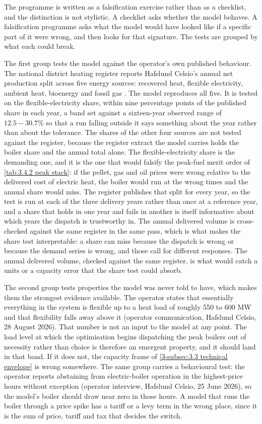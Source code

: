 The programme is written as a falsification exercise rather than as a checklist, and the distinction is not stylistic. A checklist asks whether the model behaves. A falsification programme asks what the model would have looked like if a specific part of it were wrong, and then looks for that signature. The tests are grouped by what each could break.

The first group tests the model against the operator's own published behaviour. The national district heating register reports Hafslund Celsio's annual net production split across five energy sources: recovered heat, flexible electricity, ambient heat, bioenergy and fossil gas \cite{norsk_fjernvarme_fjernkontrollenno_nodate}. The model reproduces all five. It is tested on the flexible-electricity share, within nine percentage points of the published share in each year, a band set against a sixteen-year observed range of $12.5 - 30.7\%$ so that a run falling outside it says something about the year rather than about the tolerance. The shares of the other four sources are not tested against the register, because the register extract the model carries holds the boiler share and the annual total alone. The flexible-electricity share is the demanding one, and it is the one that would falsify the peak-fuel merit order of \autoref{tab:3.4.2 peak stack}: if the pellet, gas and oil prices were wrong relative to the delivered cost of electric heat, the boiler would run at the wrong times and the annual share would miss. The register publishes that split for every year, so the test is run at each of the three delivery years rather than once at a reference year, and a share that holds in one year and fails in another is itself informative about which years the dispatch is trustworthy in. The annual delivered volume is cross-checked against the same register in the same pass, which is what makes the share test interpretable: a share can miss because the dispatch is wrong or because the demand series is wrong, and those call for different responses. The annual delivered volume, checked against the same register, is what would catch a units or a capacity error that the share test could absorb.

The second group tests properties the model was never told to have, which makes them the strongest evidence available. The operator states that essentially everything in the system is flexible up to a heat load of roughly 550 to 600 MW and that flexibility falls away above it (operator communication, Hafslund Celsio, 28 August 2026). That number is not an input to the model at any point. The load level at which the optimisation begins dispatching the peak boilers out of necessity rather than choice is therefore an emergent property, and it should land in that band. If it does not, the capacity frame of \autoref{3-subsec:3.3 technical envelope} is wrong somewhere. The same group carries a behavioural test: the operator reports abstaining from electric-boiler operation in the highest-price hours without exception (operator interview, Hafslund Celsio, 25 June 2026), so the model's boiler should draw near zero in those hours. A model that runs the boiler through a price spike has a tariff or a levy term in the wrong place, since it is the sum of price, tariff and tax that decides the switch.

